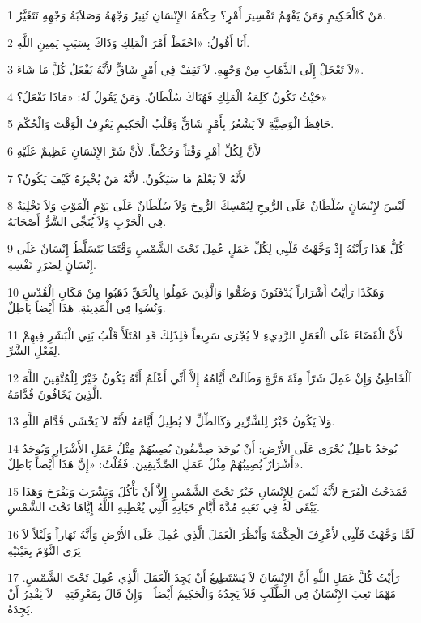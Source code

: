 \par 1 مَنْ كَالْحَكِيمِ وَمَنْ يَفْهَمُ تَفْسِيرَ أَمْرٍ؟ حِكْمَةُ الإِنْسَانِ تُنِيرُ وَجْهَهُ وَصَلاَبَةُ وَجْهِهِ تَتَغَيَّرُ.
\par 2 أَنَا أَقُولُ: «احْفَظْ أَمْرَ الْمَلِكِ وَذَاكَ بِسَبَبِ يَمِينِ اللَّهِ.
\par 3 لاَ تَعْجَلْ إِلَى الذَّهَابِ مِنْ وَجْهِهِ. لاَ تَقِفْ فِي أَمْرٍ شَاقٍّ لأَنَّهُ يَفْعَلُ كُلَّ مَا شَاءَ».
\par 4 حَيْثُ تَكُونُ كَلِمَةُ الْمَلِكِ فَهُنَاكَ سُلْطَانٌ. وَمَنْ يَقُولُ لَهُ: «مَاذَا تَفْعَلُ؟»
\par 5 حَافِظُ الْوَصِيَّةِ لاَ يَشْعُرُ بِأَمْرٍ شَاقٍّ وَقَلْبُ الْحَكِيمِ يَعْرِفُ الْوَقْتَ وَالْحُكْمَ.
\par 6 لأَنَّ لِكُلِّ أَمْرٍ وَقْتاً وَحُكْماً. لأَنَّ شَرَّ الإِنْسَانِ عَظِيمٌ عَلَيْهِ
\par 7 لأَنَّهُ لاَ يَعْلَمُ مَا سَيَكُونُ. لأَنَّهُ مَنْ يُخْبِرُهُ كَيْفَ يَكُونُ؟
\par 8 لَيْسَ لإِنْسَانٍ سُلْطَانٌ عَلَى الرُّوحِ لِيُمْسِكَ الرُّوحَ وَلاَ سُلْطَانٌ عَلَى يَوْمِ الْمَوْتِ وَلاَ تَخْلِيَةٌ فِي الْحَرْبِ وَلاَ يُنَجِّي الشَّرُّ أَصْحَابَهُ.
\par 9 كُلُّ هَذَا رَأَيْتُهُ إِذْ وَجَّهْتُ قَلْبِي لِكُلِّ عَمَلٍ عُمِلَ تَحْتَ الشَّمْسِ وَقْتَمَا يَتَسَلَّطُ إِنْسَانٌ عَلَى إِنْسَانٍ لِضَرَرِ نَفْسِهِ.
\par 10 وَهَكَذَا رَأَيْتُ أَشْرَاراً يُدْفَنُونَ وَضُمُّوا وَالَّذِينَ عَمِلُوا بِالْحَقِّ ذَهَبُوا مِنْ مَكَانِ الْقُدْسِ وَنُسُوا فِي الْمَدِينَةِ. هَذَا أَيْضاً بَاطِلٌ.
\par 11 لأَنَّ الْقَضَاءَ عَلَى الْعَمَلِ الرَّدِيءِ لاَ يُجْرَى سَرِيعاً فَلِذَلِكَ قَدِ امْتَلَأَ قَلْبُ بَنِي الْبَشَرِ فِيهِمْ لِفَعْلِ الشَّرِّ.
\par 12 اَلْخَاطِئُ وَإِنْ عَمِلَ شَرّاً مِئَةَ مَرَّةٍ وَطَالَتْ أَيَّامُهُ إِلاَّ أَنِّي أَعْلَمُ أَنَّهُ يَكُونُ خَيْرٌ لِلْمُتَّقِينَ اللَّهَ الَّذِينَ يَخَافُونَ قُدَّامَهُ.
\par 13 وَلاَ يَكُونُ خَيْرٌ لِلشِّرِّيرِ وَكَالظِّلِّ لاَ يُطِيلُ أَيَّامَهُ لأَنَّهُ لاَ يَخْشَى قُدَّامَ اللَّهِ.
\par 14 يُوجَدُ بَاطِلٌ يُجْرَى عَلَى الأَرْضِ: أَنْ يُوجَدَ صِدِّيقُونَ يُصِيبُهُمْ مِثْلُ عَمَلِ الأَشْرَارِ وَيُوجَدُ أَشْرَارٌ يُصِيبُهُمْ مِثْلُ عَمَلِ الصِّدِّيقِينَ. فَقُلْتُ: «إِنَّ هَذَا أَيْضاً بَاطِلٌ».
\par 15 فَمَدَحْتُ الْفَرَحَ لأَنَّهُ لَيْسَ لِلإِنْسَانِ خَيْرٌ تَحْتَ الشَّمْسِ إِلاَّ أَنْ يَأْكُلَ وَيَشْرَبَ وَيَفْرَحَ وَهَذَا يَبْقَى لَهُ فِي تَعَبِهِ مُدَّةَ أَيَّامِ حَيَاتِهِ الَّتِي يُعْطِيهِ اللَّهُ إِيَّاهَا تَحْتَ الشَّمْسِ.
\par 16 لَمَّا وَجَّهْتُ قَلْبِي لأَعْرِفَ الْحِكْمَةَ وَأَنْظُرَ الْعَمَلَ الَّذِي عُمِلَ عَلَى الأَرْضِ وَأَنَّهُ نَهَاراً وَلَيْلاً لاَ يَرَى النَّوْمَ بِعَيْنَيْهِ
\par 17 رَأَيْتُ كُلَّ عَمَلِ اللَّهِ أَنَّ الإِنْسَانَ لاَ يَسْتَطِيعُ أَنْ يَجِدَ الْعَمَلَ الَّذِي عُمِلَ تَحْتَ الشَّمْسِ. مَهْمَا تَعِبَ الإِنْسَانُ فِي الطَّلَبِ فَلاَ يَجِدُهُ وَالْحَكِيمُ أَيْضاً - وَإِنْ قَالَ بِمَعْرِفَتِهِ - لاَ يَقْدِرُ أَنْ يَجِدَهُ.

